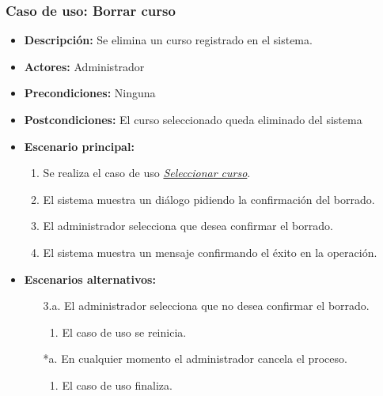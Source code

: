\documentclass{book}
\begin{document}
\subsubsection*{Caso de uso: Borrar curso}
\begin{itemize}
\item{\bf Descripción:} Se elimina un curso registrado en el sistema.
\item{\bf Actores:} Administrador
\item{\bf Precondiciones:} Ninguna
\item{\bf Postcondiciones:} El curso seleccionado queda eliminado del sistema
\item{\bf Escenario principal:}
	\begin{enumerate}
	\item Se realiza el caso de uso {\em \hyperref[select_curso]{Seleccionar curso}}.
	\item El sistema muestra un diálogo pidiendo la confirmación del borrado.
	\item El administrador selecciona que desea confirmar el borrado.
	\item El sistema muestra un mensaje confirmando el éxito en la operación.
	\end{enumerate}
\item{\bf Escenarios alternativos:}
	\begin{itemize}
		\item[3.a.] El administrador selecciona que no desea confirmar el borrado.
		\begin{enumerate}
			\item El caso de uso se reinicia.
		\end{enumerate}
		\item[*a.] En cualquier momento el administrador cancela el proceso.
		\begin{enumerate}
			\item El caso de uso finaliza.
		\end{enumerate}
	\end{itemize}
\end{itemize}
\end{document}
